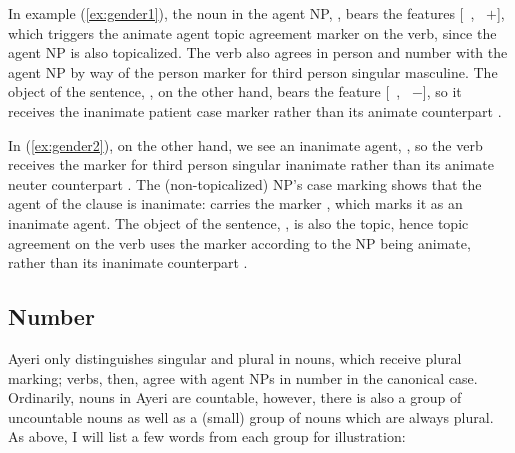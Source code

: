 In example (\ref{ex:gender1}), the noun in the agent NP,
, bears the features [\Gend{}~\M{}, \Anim{}~$+$],
which triggers the animate agent topic agreement marker  on the
verb, since the agent NP is also topicalized. The verb also agrees in person
and number with the agent NP by way of the person marker  for
third person singular masculine. The object of the sentence,
, on the other hand, bears the feature
[\Gend{}~\Inan{}, \Anim{}~$-$], so it receives the inanimate patient case
marker  rather than its animate counterpart .

In (\ref{ex:gender2}), on the other hand, we see an inanimate agent,
, so the verb receives the marker  
for third person singular inanimate rather than its animate neuter counterpart
. The (non-topicalized) NP's case marking shows that the agent 
of the clause is inanimate:  carries the marker
, which marks it as an inanimate agent. The object of the 
sentence, , is also the topic, hence topic
agreement on the verb uses the marker  according to the NP being
animate, rather than its inanimate counterpart .


\subsection{Number}

Ayeri only distinguishes singular and plural in nouns, which receive plural 
marking; verbs, then, agree with agent NPs in number in the canonical case. 
Ordinarily, nouns in Ayeri are countable, however, there is also a group of 
uncountable nouns as well as a (small) group of nouns which are always plural. 
As above, I will list a few words from each group for illustration:


